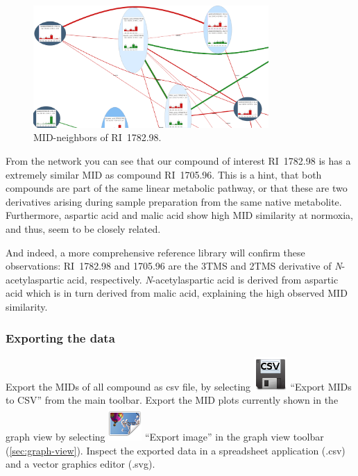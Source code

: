 \documentclass[a4paper,12pt]{scrartcl}
\begin{document}
\begin{figure}[htbp]
 \centering
 \includegraphics[width=0.8\textwidth]{./gfx/ss_tutorial_midsim.png}
 \caption{MID-neighbors of RI~1782.98.}
 \label{fig:tutorial-midsim}
\end{figure}

From the network you can see that our compound of interest RI~1782.98 is has a extremely similar MID as compound RI~1705.96. This is a hint, that both compounds are part of the same linear metabolic pathway, or that these are two derivatives arising during sample preparation from the same native metabolite.
Furthermore, aspartic acid and malic acid show high MID similarity at normoxia, and thus, seem to be closely related.

And indeed, a more comprehensive reference library will confirm these observations: RI~1782.98 and 1705.96 are the 3TMS and 2TMS derivative of \textit{N}-acetylaspartic acid, respectively. \textit{N}-acetylaspartic acid is derived from aspartic acid which is in turn derived from malic acid, explaining the high observed MID similarity.



\subsubsection{Exporting the data}

Export the MIDs of all compound as csv file, by selecting \includegraphics{../gui/icons/document-save-csv.png} ``Export MIDs to CSV'' from the main toolbar. Export the MID plots currently shown in the graph view by selecting \includegraphics{gfx/ico_export-image.png} ``Export image'' in the graph view toolbar  (\ref{sec:graph-view}). Inspect the exported data in a spreadsheet application (.csv) and a vector graphics editor (.svg).


 

 
\end{document}
